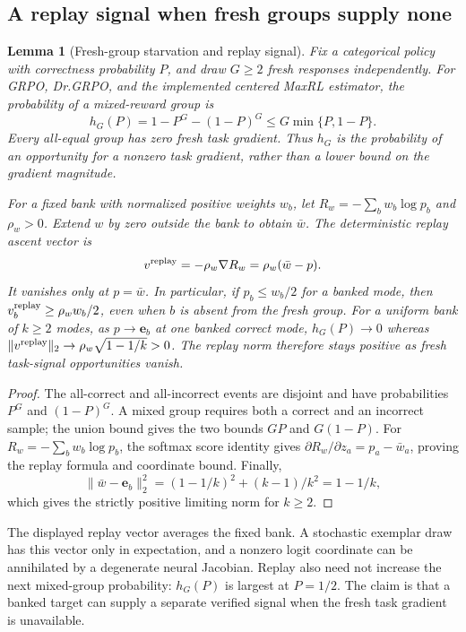 \documentclass{article}
\newcommand{\1}{\mathbf 1}
\newtheorem{lemma}{Lemma}[section]
\theoremstyle{remark}
\theoremstyle{definition}
\theoremstyle{plain}
\begin{document}
\subsection{A replay signal when fresh groups supply none}
\label{app:theory-gradient-availability}

\begin{lemma}[Fresh-group starvation and replay signal]
\label{lem:replay-gradient-availability}
Fix a categorical policy with correctness probability $P$, and draw $G\ge2$
fresh responses independently. For GRPO, Dr.GRPO, and the implemented centered
MaxRL estimator, the probability of a mixed-reward group is
\[
 h_G(P)=1-P^G-(1-P)^G\le G\min\{P,1-P\}.
\]
Every all-equal group has zero fresh task gradient. Thus $h_G$ is the
probability of an opportunity for a nonzero task gradient, rather than a
lower bound on the gradient magnitude.

For a fixed bank with normalized positive weights $w_b$, let
$R_w=-\sum_b w_b\log p_b$ and $\rho_w>0$. Extend $w$ by zero outside the
bank to obtain $\bar w$. The deterministic replay ascent vector is
\[
 v^{\rm replay}=-\rho_w\nabla R_w=\rho_w(\bar w-p).
\]
It vanishes only at $p=\bar w$. In particular, if $p_b\le w_b/2$ for a banked
mode, then $v^{\rm replay}_b\ge\rho_w w_b/2$, even when $b$ is absent from the
fresh group. For a uniform bank of $k\ge2$ modes, as $p\to\mathbf e_b$ at
one banked correct mode, $h_G(P)\to0$ whereas
$\|v^{\rm replay}\|_2\to\rho_w\sqrt{1-1/k}>0$.
The replay norm therefore stays positive as fresh task-signal opportunities vanish.
\end{lemma}

\begin{proof}
The all-correct and all-incorrect events are disjoint and have probabilities
$P^G$ and $(1-P)^G$. A mixed group requires both a correct and an incorrect
sample; the union bound gives the two bounds $GP$ and $G(1-P)$.
For $R_w=-\sum_b w_b\log p_b$, the softmax score identity gives
$\partial R_w/\partial z_a=p_a-\bar w_a$, proving the replay formula and
coordinate bound. Finally,
\[
 \|\bar w-\mathbf e_b\|_2^2=(1-1/k)^2+(k-1)/k^2=1-1/k,
\]
which gives the strictly positive limiting norm for $k\ge2$.
\end{proof}


The displayed replay vector averages the fixed bank. A stochastic exemplar
draw has this vector only in expectation, and a nonzero logit coordinate can
be annihilated by a degenerate neural Jacobian. Replay also need not increase
the next mixed-group probability: $h_G(P)$ is largest at $P=1/2$. The claim
is that a banked target can supply a separate verified signal when the fresh
task gradient is unavailable.
\end{document}
